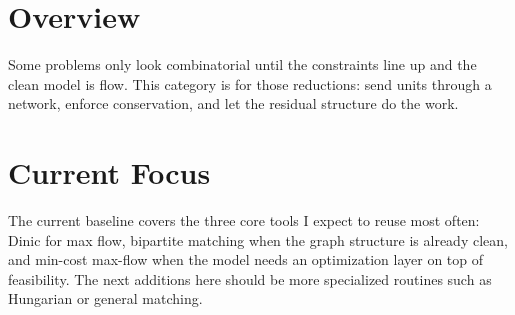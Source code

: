 \section*{Overview}

Some problems only look combinatorial until the constraints line up and the clean model is flow. This category is
for those reductions: send units through a network, enforce conservation, and let the residual structure do the work.

\section*{Current Focus}

The current baseline covers the three core tools I expect to reuse most often: Dinic for max flow, bipartite matching
when the graph structure is already clean, and min-cost max-flow when the model needs an optimization layer on top of
feasibility. The next additions here should be more specialized routines such as Hungarian or general matching.
